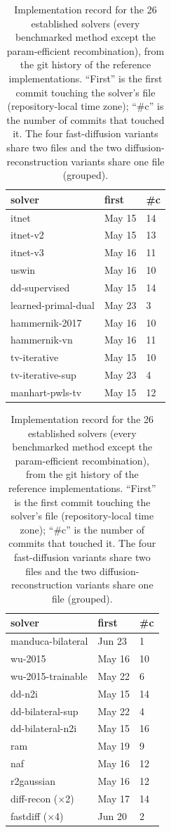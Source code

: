 \documentclass[AMA,twocolumn]{USG}
\begin{document}
\begin{table}[tbp]
\caption{Implementation record for the 26 established solvers (every benchmarked method except the param-efficient recombination), from the git history of the reference implementations. ``First'' is the first commit touching the solver's file (repository-local time zone); ``\#c'' is the number of commits that touched it. The four fast-diffusion variants share two files and the two diffusion-reconstruction variants share one file (grouped).\label{tab:s2impl}}
\centering
\footnotesize
\setlength{\tabcolsep}{4pt}
\begin{minipage}[t]{0.49\columnwidth}
\begin{tabular}{@{}lll@{}}
\toprule
\textbf{solver} & \textbf{first} & \textbf{\#c} \\
\midrule
itnet                  & May 15 & 14 \\
itnet-v2               & May 15 & 13 \\
itnet-v3               & May 16 & 11 \\
uswin                  & May 16 & 10 \\
dd-supervised          & May 15 & 14 \\
learned-primal-dual    & May 23 & 3 \\
hammernik-2017         & May 16 & 10 \\
hammernik-vn           & May 16 & 11 \\
tv-iterative           & May 15 & 10 \\
tv-iterative-sup       & May 23 & 4 \\
manhart-pwls-tv        & May 15 & 12 \\
\bottomrule
\end{tabular}
\end{minipage}\hfill
\begin{minipage}[t]{0.49\columnwidth}
\begin{tabular}{@{}lll@{}}
\toprule
\textbf{solver} & \textbf{first} & \textbf{\#c} \\
\midrule
manduca-bilateral       & Jun 23 & 1 \\
wu-2015                 & May 16 & 10 \\
wu-2015-trainable       & May 22 & 6 \\
dd-n2i                  & May 15 & 14 \\
dd-bilateral-sup        & May 22 & 4 \\
dd-bilateral-n2i        & May 15 & 16 \\
ram                     & May 19 & 9 \\
naf                     & May 16 & 12 \\
r2gaussian              & May 16 & 12 \\
diff-recon ($\times$2)  & May 17 & 14 \\
fastdiff ($\times$4)    & Jun 20 & 2 \\
\bottomrule
\end{tabular}
\end{minipage}
\end{table}
\end{document}
